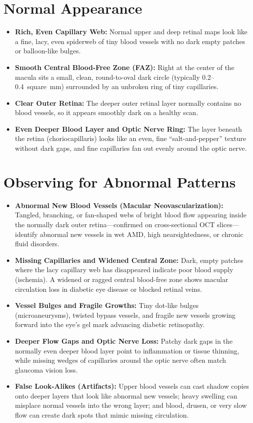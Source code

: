 \section{Normal Appearance}
\begin{itemize}
\item \textbf{Rich, Even Capillary Web:} Normal upper and deep retinal maps look like a fine, lacy, even spiderweb of tiny blood vessels with no dark empty patches or balloon-like bulges.
\item \textbf{Smooth Central Blood-Free Zone (FAZ):} Right at the center of the macula sits a small, clean, round-to-oval dark circle (typically 0.2--0.4~square~mm) surrounded by an unbroken ring of tiny capillaries.
\item \textbf{Clear Outer Retina:} The deeper outer retinal layer normally contains no blood vessels, so it appears smoothly dark on a healthy scan.
\item \textbf{Even Deeper Blood Layer and Optic Nerve Ring:} The layer beneath the retina (choriocapillaris) looks like an even, fine ``salt-and-pepper'' texture without dark gaps, and fine capillaries fan out evenly around the optic nerve.
\end{itemize}

\section{Observing for Abnormal Patterns}
\begin{itemize}
\item \textbf{Abnormal New Blood Vessels (Macular Neovascularization):} Tangled, branching, or fan-shaped webs of bright blood flow appearing inside the normally dark outer retina---confirmed on cross-sectional OCT slices---identify abnormal new vessels in wet AMD, high nearsightedness, or chronic fluid disorders.
\item \textbf{Missing Capillaries and Widened Central Zone:} Dark, empty patches where the lacy capillary web has disappeared indicate poor blood supply (ischemia). A widened or ragged central blood-free zone shows macular circulation loss in diabetic eye disease or blocked retinal veins.
\item \textbf{Vessel Bulges and Fragile Growths:} Tiny dot-like bulges (microaneurysms), twisted bypass vessels, and fragile new vessels growing forward into the eye's gel mark advancing diabetic retinopathy.
\item \textbf{Deeper Flow Gaps and Optic Nerve Loss:} Patchy dark gaps in the normally even deeper blood layer point to inflammation or tissue thinning, while missing wedges of capillaries around the optic nerve often match glaucoma vision loss.
\item \textbf{False Look-Alikes (Artifacts):} Upper blood vessels can cast shadow copies onto deeper layers that look like abnormal new vessels; heavy swelling can misplace normal vessels into the wrong layer; and blood, drusen, or very slow flow can create dark spots that mimic missing circulation.
\end{itemize}

